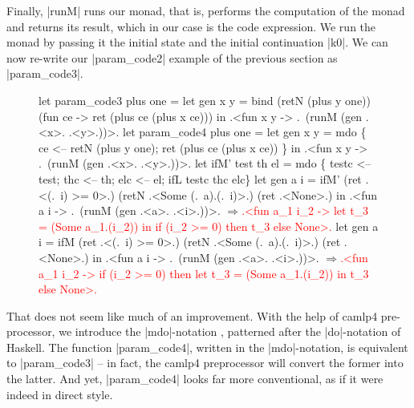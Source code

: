 \documentclass{llncs}
\newcommand{\evalresult}[1]{\ensuremath{\Longrightarrow}\textcolor{red}{#1}}
\begin{document}
Finally, |runM| runs our monad, that is, performs the computation of
the monad and returns its result, which in our case is the code
expression. We run the monad by passing it the initial state and the
initial continuation |k0|. We can now re-write our |param_code2|
example of the previous section as |param_code3|.

\begin{figure}
\begin{code}
let param_code3 plus one =
  let gen x y = bind (retN (plus y one)) (fun ce -> 
                ret (plus ce (plus x ce)))
  in .<fun x y -> .~(runM (gen .<x>. .<y>.))>.
let param_code4 plus one =
  let gen x y = mdo \{ ce <-- retN (plus y one);
                      ret (plus ce (plus x ce)) \}
  in .<fun x y -> .~(runM (gen .<x>. .<y>.))>.
let ifM' test th el = mdo \{
  testc <-- test; thc <-- th; elc <-- el;
  ifL testc thc elc\}
let gen a i = ifM' (ret .<(.~i) >= 0>.) 
                   (retN .<Some (.~a).(.~i)>.) (ret .<None>.)
 in .<fun a i -> .~(runM (gen .<a>. .<i>.))>.
\evalresult{.<fun a_1 i_2 ->  
let t_3 = (Some a_1.(i_2)) in if (i_2 >= 0) then t_3 else None>.}
let gen a i = ifM (ret .<(.~i) >= 0>.) 
                  (retN .<Some (.~a).(.~i)>.) (ret .<None>.)
 in .<fun a i -> .~(runM (gen .<a>. .<i>.))>.
\evalresult{.<fun a_1 i_2 -> 
if (i_2 >= 0) then let t_3 = (Some a_1.(i_2)) in t_3 else None>.}
\end{code}
\end{figure}

That does not seem like much of an improvement. With the help of
camlp4 pre-processor, we introduce the |mdo|-notation \cite{metamonadsURL},
patterned after the |do|-notation of Haskell. The function
|param_code4|, written in the |mdo|-notation, is equivalent to
|param_code3| -- in fact, the camlp4 preprocessor will convert the
former into the latter. And yet, |param_code4| looks far more
conventional, as if it were indeed in direct style.
\end{document}
